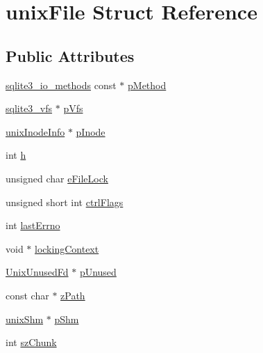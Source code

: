 \hypertarget{structunix_file}{\section{unix\-File Struct Reference}
\label{structunix_file}
}
\subsection*{Public Attributes}
\begin{DoxyCompactItemize}
\item 
\hyperlink{structsqlite3__io__methods}{sqlite3\-\_\-io\-\_\-methods} const $\ast$ \hyperlink{structunix_file_a2a2b40e965f91aa9ee21135bfb0c17ec}{p\-Method}
\item 
\hyperlink{structsqlite3__vfs}{sqlite3\-\_\-vfs} $\ast$ \hyperlink{structunix_file_a048d696479bb2544ab2cec1ac9a75d67}{p\-Vfs}
\item 
\hyperlink{structunix_inode_info}{unix\-Inode\-Info} $\ast$ \hyperlink{structunix_file_ac17292fe29bb6cc9eceed9db6d1209e8}{p\-Inode}
\item 
int \hyperlink{structunix_file_a1c58798d4ff3ac6232765c8b76bb7450}{h}
\item 
unsigned char \hyperlink{structunix_file_a001e59bdb9d3f396952c2c8e3229f7fc}{e\-File\-Lock}
\item 
unsigned short int \hyperlink{structunix_file_a05d9d0af8aa4d9de6a250984cc12ae56}{ctrl\-Flags}
\item 
int \hyperlink{structunix_file_afde57c2e118fac8041918dac2ee6f7d1}{last\-Errno}
\item 
void $\ast$ \hyperlink{structunix_file_afaeb4425a6de3e913db4b03e8a0d098a}{locking\-Context}
\item 
\hyperlink{struct_unix_unused_fd}{Unix\-Unused\-Fd} $\ast$ \hyperlink{structunix_file_a3820ccead5805d2ea61ca1c752646852}{p\-Unused}
\item 
const char $\ast$ \hyperlink{structunix_file_afc5eff0948d553308cf90a79d4a06f17}{z\-Path}
\item 
\hyperlink{structunix_shm}{unix\-Shm} $\ast$ \hyperlink{structunix_file_a53c653bd73cdc6f518ecffe95062e91a}{p\-Shm}
\item 
int \hyperlink{structunix_file_a5f6307d3446ce1b149df756c00c3bd2e}{sz\-Chunk}
\end{DoxyCompactItemize}


